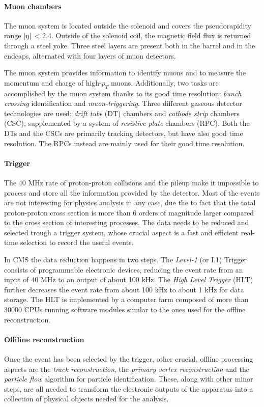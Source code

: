 \paragraph{Muon chambers}

The muon system is located outside the solenoid and covers the pseudorapidity range
$\abs{\eta}$ < 2.4. Outside of the solenoid coil, the magnetic field flux is returned through a steel
yoke. Three steel layers are present both in the barrel and in the endcaps, alternated with
four layers of muon detectors.


The muon system provides information to identify muons and to measure the momentum
and charge of high-$p_T$ muons. Additionally, two tasks are accomplished by the muon system thanks to its good time resolution: \emph{bunch crossing} identification and \emph{muon-triggering}.
Three different gaseous detector technologies are used: \emph{drift tube} (DT) chambers and \emph{cathode strip} chambers (CSC), supplemented by a system of \emph{resistive plate} chambers (RPC). Both the DTs and the CSCs are primarily tracking detectors, but have also
good time resolution. The RPCs instead are mainly used for their good time resolution.


\paragraph{Trigger}

The 40 MHz rate of proton-proton collisions and the pileup make it impossible to process
and store all the information provided by the detector. Most of the events are not interesting
for physics analysis in any case, due the to fact that the total proton-proton cross section
is more than 6 orders of magnitude larger compared to the cross section of interesting processes. The data needs to be reduced and selected trough a trigger system, whose crucial
aspect is a fast and efficient real-time selection to record the useful events.

In CMS the data reduction happens in two steps. The \emph{Level-1} (or L1) Trigger consists of programmable electronic devices, reducing  the event rate from an input of 40 MHz to an output of about 100 kHz. The
\emph{High Level Trigger} (HLT) further decreases the event rate from about 100 kHz to about 1 kHz for data storage. The HLT is implemented by a computer farm composed of more than 30000 CPUs
running software modules similar to the ones used for the offline reconstruction. 

\paragraph{Offiline reconstruction}
Once the event has been selected by the trigger, other crucial, offline processing aspects are the \emph{track reconstruction}, the \emph{primary vertex reconstruction} and the \emph{particle flow} algorithm for particle identification. These, along with other minor steps, are all needed to transform the electronic outputs of the apparatus into a collection of physical objects needed for the analysis.

